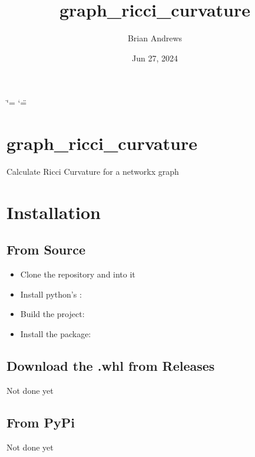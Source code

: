 \documentclass[letterpaper,10pt,english]{sphinxmanual}
\title{graph\_ricci\_curvature}
\date{Jun 27, 2024}
\author{Brian Andrews}
\begin{document}
\ifdefined\shorthandoff
  \ifnum\catcode`\=\string=\active\shorthandoff{=}\fi
  \ifnum\catcode`\"=\active{}\fi
\fi

\pagestyle{empty}
\sphinxmaketitle
\pagestyle{plain}
\sphinxtableofcontents
\pagestyle{normal}
\label{\detokenize{index::doc}}



\chapter{graph\_ricci\_curvature}
\label{\detokenize{index:graph-ricci-curvature}}
\sphinxAtStartPar
Calculate Ricci Curvature for a networkx graph


\chapter{Installation}
\label{\detokenize{index:installation}}

\section{From Source}
\label{\detokenize{index:from-source}}\begin{itemize}
\item {} 
\sphinxAtStartPar
Clone the repository and  into it

\item {} 
\sphinxAtStartPar
Install python’s : 

\item {} 
\sphinxAtStartPar
Build the project: 

\item {} 
\sphinxAtStartPar
Install the package: 

\end{itemize}


\section{Download the .whl from Releases}
\label{\detokenize{index:download-the-whl-from-releases}}
\sphinxAtStartPar
Not done yet


\section{From PyPi}
\label{\detokenize{index:from-pypi}}
\sphinxAtStartPar
Not done yet
\end{document}
